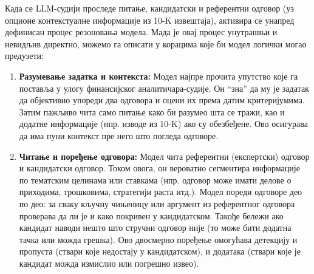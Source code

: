Када се LLM-судији проследе питање, кандидатски и референтни одговор (уз опционе контекстуалне информације из 10-K извештаја), активира се унапред дефинисан процес резоновања модела. Мада је овај процес унутрашњи и невидљив директно, можемо га описати у корацима које би модел логички могао предузети:

\begin{enumerate}
    \item \textbf{Разумевање задатка и контекста:} Модел најпре прочита упутство које га поставља у улогу финансијског аналитичара-судије. Он ``зна'' да му је задатак да објективно упореди два одговора и оцени их према датим критеријумима. Затим пажљиво чита само питање како би разумео шта се тражи, као и додатне информације (нпр. изводе из 10-K) ако су обезбеђене. Ово осигурава да има пуни контекст пре него што погледа одговоре.

    \item \textbf{Читање и поређење одговора:} Модел чита референтни (експертски) одговор и кандидатски одговор. Током овога, он вероватно сегментира информације по тематским целинама или ставкама (нпр. одговор може имати делове о приходима, трошковима, стратегији раста итд.). Модел пореди одговоре део по део: за сваку кључну чињеницу или аргумент из референтног одговора проверава да ли је и како покривен у кандидатском. Такође бележи ако кандидат наводи нешто што стручни одговор није (то може бити додатна тачка или можда грешка). Ово двосмерно поређење омогућава детекцију и пропуста (ствари које недостају у кандидатском), и додатака (ствари које је кандидат можда измислио или погрешно извео).


\end{enumerate}
